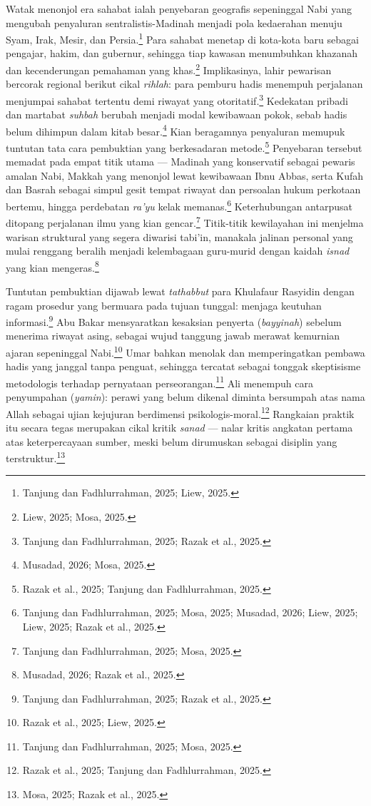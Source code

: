 Watak menonjol era sahabat ialah penyebaran geografis sepeninggal Nabi yang mengubah penyaluran sentralistis-Madinah menjadi pola kedaerahan menuju Syam, Irak, Mesir, dan Persia.\footnote{Tanjung dan Fadhlurrahman, 2025; Liew, 2025.} Para sahabat menetap di kota-kota baru sebagai pengajar, hakim, dan gubernur, sehingga tiap kawasan menumbuhkan khazanah dan kecenderungan pemahaman yang khas.\footnote{Liew, 2025; Mosa, 2025.} Implikasinya, lahir pewarisan bercorak regional berikut cikal \textit{rihlah}: para pemburu hadis menempuh perjalanan menjumpai sahabat tertentu demi riwayat yang otoritatif.\footnote{Tanjung dan Fadhlurrahman, 2025; Razak et al., 2025.} Kedekatan pribadi dan martabat \textit{suhbah} berubah menjadi modal kewibawaan pokok, sebab hadis belum dihimpun dalam kitab besar.\footnote{Musadad, 2026; Mosa, 2025.} Kian beragamnya penyaluran memupuk tuntutan tata cara pembuktian yang berkesadaran metode.\footnote{Razak et al., 2025; Tanjung dan Fadhlurrahman, 2025.} Penyebaran tersebut memadat pada empat titik utama --- Madinah yang konservatif sebagai pewaris amalan Nabi, Makkah yang menonjol lewat kewibawaan Ibnu Abbas, serta Kufah dan Basrah sebagai simpul gesit tempat riwayat dan persoalan hukum perkotaan bertemu, hingga perdebatan \textit{ra'yu} kelak memanas.\footnote{Tanjung dan Fadhlurrahman, 2025; Mosa, 2025; Musadad, 2026; Liew, 2025; Liew, 2025; Razak et al., 2025.} Keterhubungan antarpusat ditopang perjalanan ilmu yang kian gencar.\footnote{Tanjung dan Fadhlurrahman, 2025; Mosa, 2025.} Titik-titik kewilayahan ini menjelma warisan struktural yang segera diwarisi tabi'in, manakala jalinan personal yang mulai renggang beralih menjadi kelembagaan guru-murid dengan kaidah \textit{isnad} yang kian mengeras.\footnote{Musadad, 2026; Razak et al., 2025.}

Tuntutan pembuktian dijawab lewat \textit{tathabbut} para Khulafaur Rasyidin dengan ragam prosedur yang bermuara pada tujuan tunggal: menjaga keutuhan informasi.\footnote{Tanjung dan Fadhlurrahman, 2025; Razak et al., 2025.} Abu Bakar mensyaratkan kesaksian penyerta (\textit{bayyinah}) sebelum menerima riwayat asing, sebagai wujud tanggung jawab merawat kemurnian ajaran sepeninggal Nabi.\footnote{Razak et al., 2025; Liew, 2025.} Umar bahkan menolak dan memperingatkan pembawa hadis yang janggal tanpa penguat, sehingga tercatat sebagai tonggak skeptisisme metodologis terhadap pernyataan perseorangan.\footnote{Tanjung dan Fadhlurrahman, 2025; Mosa, 2025.} Ali menempuh cara penyumpahan (\textit{yamin}): perawi yang belum dikenal diminta bersumpah atas nama Allah sebagai ujian kejujuran berdimensi psikologis-moral.\footnote{Razak et al., 2025; Tanjung dan Fadhlurrahman, 2025.} Rangkaian praktik itu secara tegas merupakan cikal kritik \textit{sanad} --- nalar kritis angkatan pertama atas keterpercayaan sumber, meski belum dirumuskan sebagai disiplin yang terstruktur.\footnote{Mosa, 2025; Razak et al., 2025.}

